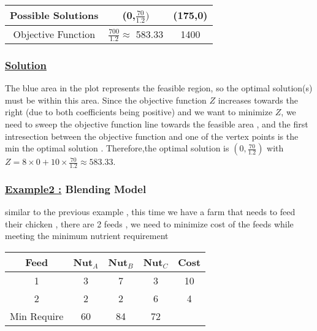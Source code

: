 \vspace{0.75cm} 
\begin{center}
    \begin{tabular}{|c|c|c|}
        \hline 
        Possible Solutions  & (0,\(\frac{70}{1.2})\) & (175,0)\\
        \hline 
        Objective Function & \(\frac{700}{1.2}\approx\) 583.33 & 1400\\
        \hline 
    \end{tabular}
\end{center}

\subsubsection*{\underline{Solution}}

The blue area in the plot represents the feasible region, so the optimal solution(s) must be within this area. Since
the objective function \( Z \) increases towards the right (due to both coefficients being positive) and we want to
minimize \( Z \), we need to sweep the objective function line towards the feasible area , and the first intresection 
between the objective function and one of the vertex points is the min the optimal solution . Therefore,the optimal 
solution is \((0, \frac{70}{1.2})\) with \( Z = 8 \times 0 + 10 \times \frac{70}{1.2} \approx 583.33 \).


\subsubsection*{\underline{Example2 :} Blending Model}

\vspace{0.25cm}
similar to the previous example , this time we have a farm that needs to feed their chicken , there are 2 feeds
, we need to minimize cost of the feeds while meeting the minimum nutrient requirement

\vspace{0.25cm}
\begin{center}
\begin{tabular}{|c|c|c|c|c|}
    \hline 
    Feed & Nut$_{A}$ & Nut$_{B}$ & Nut$_{C}$ & Cost\\
    \hline 
    1 & 3 & 7 & 3 & 10\\
    \hline 
    2 & 2 & 2 & 6 & 4\\
    \hline
    Min Require & 60 & 84 & 72 &\\
    \hline
\end{tabular}
\end{center}

